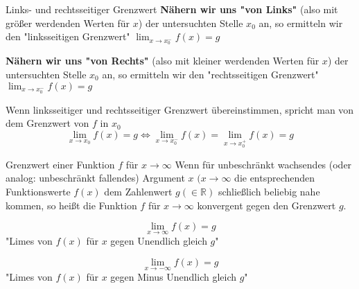 \documentclass[a6paper,12pt,print,grid=none,parskip=half]{kartei}
\begin{document}
\begin{karte}{Links- und rechtsseitiger Grenzwert}
\textbf{Nähern wir uns "von Links"} (also mit größer werdenden Werten für $x$) der untersuchten Stelle $x_0$ an, 
so ermitteln wir den "linksseitigen Grenzwert" $\lim_{x \rightarrow x_0^-} f(x) = g$
 
\textbf{Nähern wir uns "von Rechts"} (also mit kleiner werdenden Werten für $x$) der untersuchten Stelle $x_0$ an, 
so ermitteln wir den "rechtsseitigen Grenzwert" $\lim_{x \rightarrow x_0^-} f(x) = g$

Wenn linksseitiger und rechtsseitiger Grenzwert übereinstimmen, spricht man von dem Grenzwert von $f$ in $x_0$
\[\mathop {\lim }\limits_{x \to {x_0}} f(x) = g \Leftrightarrow \mathop {\lim }\limits_{x \to x_0^ - } f(x) = \mathop {\lim }\limits_{x \to x_0^ + } f(x) = g
\]
\end{karte}

\begin{karte}{Grenzwert einer Funktion $f$ für $x \rightarrow \infty$}
Wenn für unbeschränkt wachsendes (oder analog: unbeschränkt fallendes) Argument $x$ $(x \rightarrow \infty$ die entsprechenden Funktionswerte $f(x)$ dem Zahlenwert $g (\in \mathbb{R})$ 
schließlich beliebig nahe kommen, so heißt die Funktion $f$ für $x \rightarrow \infty$ konvergent gegen den Grenzwert $g$.

\[\mathop {\lim }\limits_{x \to \infty } f(x) = g\]
"Limes von $f(x)$ für $x$ gegen Unendlich gleich $g$"

\[\mathop {\lim }\limits_{x \to -\infty } f(x) = g\]
"Limes von $f(x)$ für $x$ gegen Minus Unendlich gleich $g$"
\end{karte}


\end{document}
